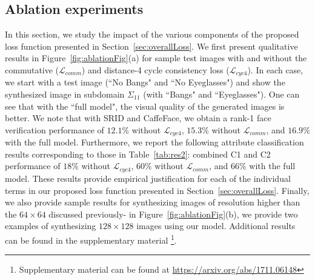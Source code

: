 \documentclass[10pt,twocolumn,letterpaper]{article}
\begin{document}
\subsection{Ablation experiments}
In this section, we study the impact of the various components of the proposed loss function presented in Section~\ref{sec:overallLoss}. We first present qualitative results in Figure~\ref{fig:ablationFig}(a) for sample test images with and without the commutative ($\mathcal{L}_{comm}$) and distance-4 cycle consistency loss ($\mathcal{L}_{cyc4}$). In each case, we start with a test image (``No Bangs" and ``No Eyeglasses") and show the synthesized image in subdomain $\Sigma_{11}$ (with ``Bangs" and ``Eyeglasses"). One can see that with the ``full model", the visual quality of the generated images is better. We note that with SRID and CaffeFace, we obtain a rank-1 face verification performance of $12.1\%$ without $\mathcal{L}_{cyc4}$, $15.3\%$ without $\mathcal{L}_{comm}$, and $16.9\%$ with the full model. Furthermore, we report the following attribute classification results corresponding to those in Table~\ref{tab:res2}: combined C1 and C2 performance of $18\%$ without $\mathcal{L}_{cyc4}$, $60\%$ without $\mathcal{L}_{comm}$, and $66\%$ with the full model. These results provide empirical justification for each of the individual terms in our proposed loss function presented in Section~\ref{sec:overallLoss}. Finally, we also provide sample results for synthesizing images of resolution higher than the $64\times 64$ discussed previously- in Figure~\ref{fig:ablationFig}(b), we provide two examples of synthesizing $128\times 128$ images using our model. Additional results can be found in the supplementary material \footnote{Supplementary material can be found at \url{https://arxiv.org/abs/1711.06148}}. 
\end{document}
